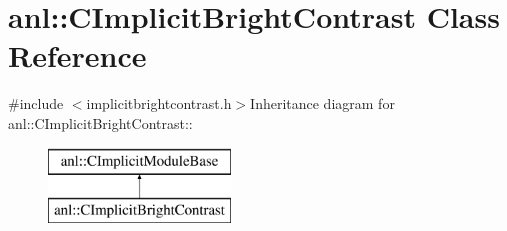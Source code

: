 \hypertarget{classanl_1_1CImplicitBrightContrast}{
\section{anl::CImplicitBrightContrast Class Reference}
\label{classanl_1_1CImplicitBrightContrast}
}


{\ttfamily \#include $<$implicitbrightcontrast.h$>$}Inheritance diagram for anl::CImplicitBrightContrast::\begin{figure}[H]
\begin{center}
\leavevmode
\includegraphics[height=2cm]{classanl_1_1CImplicitBrightContrast}
\end{center}
\end{figure}
